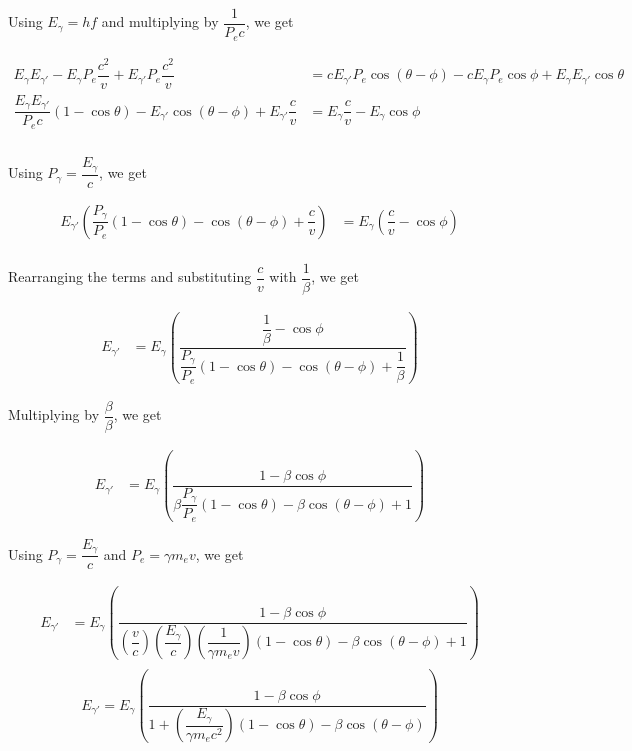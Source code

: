 \documentclass{article}
\begin{document}
\noindent Using $E_{\gamma} = hf$ and multiplying by $\dfrac{1}{P_ec}$, we get

\begin{equation*}
\begin{split}
E_{\gamma}E_{\gamma'} - E_{\gamma}P_e\dfrac{c^2}{v} + E_{\gamma'}P_e\dfrac{c^2}{v} &= cE_{\gamma'}P_{e}\cos(\theta - \phi) - cE_{\gamma}P_{e}\cos\phi + E_{\gamma}E_{\gamma'}\cos\theta\\
\dfrac{E_{\gamma}E_{\gamma'}}{P_ec}(1 - \cos\theta) - E_{\gamma'}\cos(\theta - \phi) + E_{\gamma'}\dfrac{c}{v} &= E_{\gamma}\dfrac{c}{v} - E_{\gamma}\cos\phi\\
\end{split}
\end{equation*}\\

\noindent Using $P_{\gamma} = \dfrac{E_\gamma}{c}$, we get

\begin{equation*}
\begin{split}
E_{\gamma'}\left(\dfrac{P_{\gamma}}{P_e}(1 - \cos\theta) - \cos(\theta - \phi) + \dfrac{c}{v}\right) &= E_{\gamma}\left(\dfrac{c}{v} - \cos\phi\right) \\
\end{split}
\end{equation*}

\noindent Rearranging the terms and substituting $\dfrac{c}{v}$ with $\dfrac{1}{\beta}$, we get

\begin{equation*}
\begin{split}
E_{\gamma'} &= E_{\gamma}\left(\dfrac{\dfrac{1}{\beta} - \cos\phi}{\dfrac{P_{\gamma}}{P_e}(1 - \cos\theta) - \cos(\theta - \phi) + \dfrac{1}{\beta}}\right)
\end{split}
\end{equation*}

\noindent Multiplying by $\dfrac{\beta}{\beta}$, we get

\begin{equation*}
\begin{split}
E_{\gamma'} &= E_{\gamma}\left(\dfrac{1 - \beta\cos\phi}{\beta\dfrac{P_{\gamma}}{P_e}(1 - \cos\theta) -\beta\cos(\theta - \phi) + 1}\right)
\end{split}
\end{equation*}

\noindent Using $P_\gamma = \dfrac{E_\gamma}{c}$ and $P_e = \gamma m_ev$, we get

\begin{equation*}
\begin{split}
E_{\gamma'} &= E_{\gamma}\left(\dfrac{1 - \beta\cos\phi}{\left(\dfrac{v}{c}\right)\left(\dfrac{E_{\gamma}}{c}\right)\left(\dfrac{1}{\gamma m_ev}\right)(1 - \cos\theta) -\beta\cos(\theta - \phi) + 1}\right) \\
\end{split}
\end{equation*}
\begin{equation}
E_{\gamma'} = E_{\gamma}\left(\dfrac{1 - \beta\cos\phi}{1 + \left(\dfrac{E_{\gamma}}{\gamma m_ec^2}\right)(1 - \cos\theta) -\beta\cos(\theta - \phi)}\right)
\end{equation}
\end{document}
